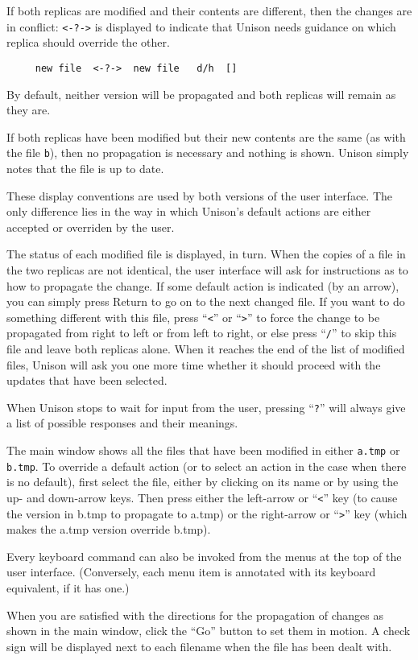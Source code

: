 \documentclass{article}
\begin{document}
If both replicas are modified and their contents are different, then
the changes are in conflict: \texttt{<-?->} is displayed to indicate
that Unison needs guidance on which replica should override the
other.  
\begin{verbatim}
     new file  <-?->  new file   d/h  []
\end{verbatim}
By default, neither version will be propagated and both
replicas will remain as they are.  

If both replicas have been modified but their new contents are the same
(as with the file {\tt b}), then no propagation is necessary and
nothing is shown.  Unison simply notes that the file is up to date.

These display conventions are used by both versions of the user
interface.  The only difference lies in the way in which Unison's
default actions are either accepted or overriden by the user.

\begin{textui}
The status of each modified file is displayed, in turn.  
When the copies of a file in the two replicas are not identical, the
user interface will ask for instructions as to how to propagate the
change.  If some default action is indicated (by an arrow), you can
simply press Return to go on to the next changed file.  If you want to
do something different with this file, press ``\verb|<|'' or ``\verb|>|'' to force
the change to be propagated from right to left or from left to right,
or else press ``\verb|/|'' to skip this file and leave both replicas alone.
When it reaches the end of the list of modified files, Unison will ask
you one more time whether it should proceed with the updates that have
been selected.

When Unison stops to wait for input from the user, pressing ``\verb|?|''
will always give a list of possible responses and their meanings.
\end{textui}

\begin{tkui}  
The main window shows all the files that have been modified in either
{\tt a.tmp} or {\tt b.tmp}.  To override a default action (or to select
an action in the case when there is no default), first select the file, either
by clicking on its name or by using the up- and down-arrow keys.  Then
press either the left-arrow or ``\verb|<|'' key (to cause the version in b.tmp to
propagate to a.tmp) or the right-arrow or ``\verb|>|'' key (which makes the a.tmp
version override b.tmp). 

Every keyboard command can also be invoked from the menus at the top
of the user interface.  (Conversely, each menu item is annotated with
its keyboard equivalent, if it has one.)

When you are satisfied with the directions for the propagation of changes
as shown in the main window, click the ``Go'' button to set them in
motion.  A check sign will be displayed next to each filename
when the file has been dealt with.
\end{tkui}
\end{document}
